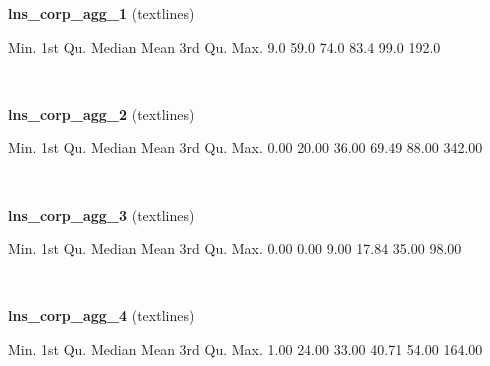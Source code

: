 \documentclass[]{article}
\newenvironment{Shaded}{\begin{snugshade}}{\end{snugshade}}
\newcommand{\FloatTok}[1]{\textcolor[rgb]{0.00,0.00,0.81}{{#1}}}
\newcommand{\NormalTok}[1]{{#1}}
\begin{document}
\textbf{lns\_corp\_agg\_1} (textlines)

\begin{Shaded}
\begin{Highlighting}[]
   \NormalTok{Min. 1st Qu.  Median    Mean 3rd Qu.    Max. }
    \FloatTok{9.0}    \FloatTok{59.0}    \FloatTok{74.0}    \FloatTok{83.4}    \FloatTok{99.0}   \FloatTok{192.0} 
\end{Highlighting}
\end{Shaded}

~

\vspace{1em}

\textbf{lns\_corp\_agg\_2} (textlines)

\begin{Shaded}
\begin{Highlighting}[]
   \NormalTok{Min. 1st Qu.  Median    Mean 3rd Qu.    Max. }
   \FloatTok{0.00}   \FloatTok{20.00}   \FloatTok{36.00}   \FloatTok{69.49}   \FloatTok{88.00}  \FloatTok{342.00} 
\end{Highlighting}
\end{Shaded}

~

\vspace{1em}

\textbf{lns\_corp\_agg\_3} (textlines)

\begin{Shaded}
\begin{Highlighting}[]
   \NormalTok{Min. 1st Qu.  Median    Mean 3rd Qu.    Max. }
   \FloatTok{0.00}    \FloatTok{0.00}    \FloatTok{9.00}   \FloatTok{17.84}   \FloatTok{35.00}   \FloatTok{98.00} 
\end{Highlighting}
\end{Shaded}

~

\vspace{1em}

\textbf{lns\_corp\_agg\_4} (textlines)

\begin{Shaded}
\begin{Highlighting}[]
   \NormalTok{Min. 1st Qu.  Median    Mean 3rd Qu.    Max. }
   \FloatTok{1.00}   \FloatTok{24.00}   \FloatTok{33.00}   \FloatTok{40.71}   \FloatTok{54.00}  \FloatTok{164.00} 
\end{Highlighting}
\end{Shaded}

~

\vspace{1em}
\end{document}
